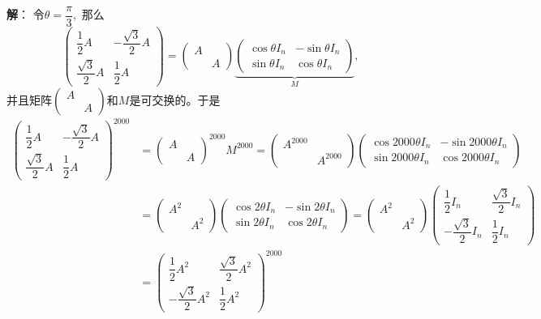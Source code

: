 {\bf 解}： 令$\theta = \dfrac{\pi}{3},$ 那么
$$\begin{pmatrix} \dfrac{1}{2} A & - \dfrac{\sqrt{3}}{2} A \\ \dfrac{\sqrt{3}}{2} A & \dfrac{1}{2} A \end{pmatrix} = \begin{pmatrix} A & \\ & A \end{pmatrix} \underbrace{\begin{pmatrix} \cos\theta I_n & - \sin\theta I_n \\ \sin\theta I_n & \cos\theta I_n \end{pmatrix}}_M,$$
并且矩阵$\begin{pmatrix} A & \\ & A \end{pmatrix}$和$M$是可交换的。于是
\begin{align*}
\begin{pmatrix} \dfrac{1}{2} A & - \dfrac{\sqrt{3}}{2} A \\ \dfrac{\sqrt{3}}{2} A & \dfrac{1}{2} A \end{pmatrix}^{2000} & = \begin{pmatrix} A & \\ & A \end{pmatrix}^{2000} M^{2000} = \begin{pmatrix} A^{2000} & \\ & A^{2000} \end{pmatrix} \begin{pmatrix} \cos 2000\theta I_n & - \sin 2000\theta I_n \\ \sin 2000\theta I_n & \cos 2000\theta I_n \end{pmatrix} \\
& = \begin{pmatrix} A^2 & \\ & A^2 \end{pmatrix} \begin{pmatrix} \cos 2\theta I_n & - \sin 2\theta I_n \\ \sin 2\theta I_n & \cos 2\theta I_n \end{pmatrix} = \begin{pmatrix} A^2 & \\ & A^2 \end{pmatrix} \begin{pmatrix} \dfrac{1}{2} I_n & \dfrac{\sqrt{3}}{2} I_n \\ - \dfrac{\sqrt{3}}{2} I_n & \dfrac{1}{2} I_n \end{pmatrix} \\
& = \begin{pmatrix} \dfrac{1}{2} A^2 & \dfrac{\sqrt{3}}{2} A^2 \\ - \dfrac{\sqrt{3}}{2} A^2 & \dfrac{1}{2} A^2 \end{pmatrix}^{2000}
\end{align*}


